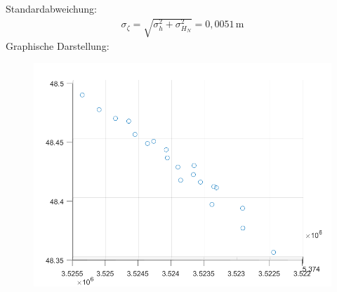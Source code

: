 \documentclass[12pt
,headinclude
,headsepline
,bibtotocnumbered
]{scrartcl}
\begin{document}
Standardabweichung:
\begin{align*}
	\sigma_\zeta=\sqrt{\sigma^2_h+\sigma_{H_N}^2}=0,0051\,\mathrm{m}
\end{align*}
Graphische Darstellung:
\begin{figure}[h]
	\centering
	\includegraphics[width=12cm]{anomalie}
\end{figure}
\end{document}
